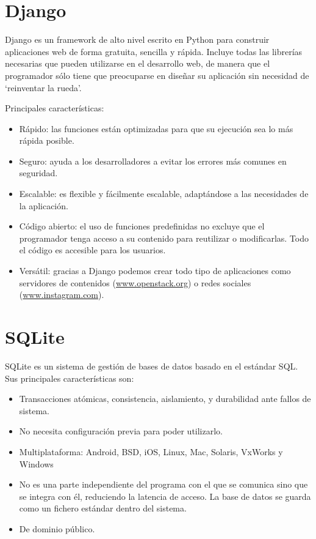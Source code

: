 \documentclass[a4paper, 12pt]{book}
\begin{document}
\section{Django} 
\label{sec:seccion3}
Django es un framework de alto nivel escrito en Python para construir aplicaciones web de forma gratuita, sencilla y rápida. Incluye todas las librerías necesarias que pueden utilizarse en el desarrollo web, de manera que el programador sólo tiene que preocuparse en diseñar su aplicación sin necesidad de `reinventar la rueda'.

Principales características:
\begin{itemize}
	\item Rápido: las funciones están optimizadas para que su ejecución sea lo más rápida posible.
	\item Seguro: ayuda a los desarrolladores a evitar los errores más comunes en seguridad.  
	\item Escalable: es flexible y fácilmente escalable, adaptándose a las necesidades de la aplicación. 
	\item Código abierto: el uso de funciones predefinidas no excluye que el programador tenga acceso a su contenido para reutilizar o modificarlas. Todo el código es accesible para los usuarios. 
	\item Versátil: gracias a Django podemos crear todo tipo de aplicaciones como servidores de contenidos (\url{www.openstack.org}) o redes sociales (\url{www.instagram.com}).
\end{itemize}
\section{SQLite} 
\label{sec:seccion4}
SQLite es un sistema de gestión de bases de datos basado en el estándar SQL. Sus principales características son:
\begin{itemize}
	\item Transacciones atómicas, consistencia, aislamiento, y durabilidad ante fallos de sistema. 
	\item No necesita configuración previa para poder utilizarlo.
	\item Multiplataforma: Android, BSD, iOS, Linux, Mac, Solaris, VxWorks y Windows
	\item No es una parte independiente del programa con el que se comunica sino que se integra con él, reduciendo la latencia de acceso. La base de datos se guarda como un fichero estándar dentro del sistema. 
	\item De dominio público. 
\end{itemize}
\end{document}
